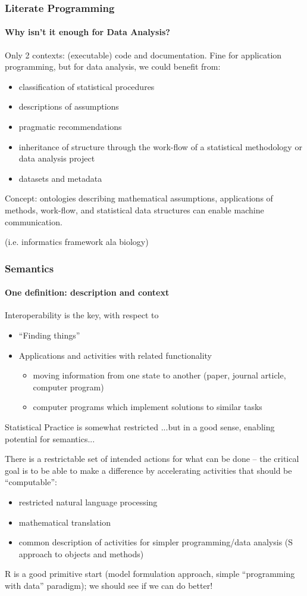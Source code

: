 \documentclass{beamer}
\begin{document}
\begin{frame}
  \frametitle{Literate Programming}
  \framesubtitle{Why isn't it enough for Data Analysis?}

  Only 2 contexts: (executable) code and documentation.  Fine for
  application programming,  but for data analysis, we could benefit
  from:
  \begin{itemize}
  \item classification of statistical procedures
  \item descriptions of assumptions
  \item pragmatic recommendations
  \item inheritance of structure through the work-flow of a
    statistical methodology or data analysis project
  \item datasets and metadata
  \end{itemize}
  Concept: ontologies describing mathematical assumptions, applications
  of methods, work-flow, and statistical data structures can enable
  machine communication.
  
  (i.e. informatics framework ala biology)
\end{frame}

\begin{frame}  \frametitle{Semantics}
  \framesubtitle{One definition: description and context}

  Interoperability is the key, with respect to
  \begin{itemize}
  \item ``Finding things''
  \item Applications and activities with related functionality
    \begin{itemize}
    \item moving information from one state to another (paper, journal
      article, computer program)
    \item computer programs which implement solutions to similar tasks
    \end{itemize}
  \end{itemize}
\end{frame}

\begin{frame}{Statistical Practice is somewhat restricted}
  {...but in a good sense, enabling potential for semantics...}

  There is a restrictable set of intended actions for what can be done
  -- the critical goal is to be able to make a difference by
  accelerating activities that should be ``computable'':
  \begin{itemize}
  \item restricted natural language processing
  \item mathematical translation
  \item common description of activities for simpler programming/data
    analysis (S approach to objects and methods)
  \end{itemize}
  R is a good primitive start (model formulation approach, simple
  ``programming with data'' paradigm); we should see if we can do
  better!
\end{frame}
\end{document}
